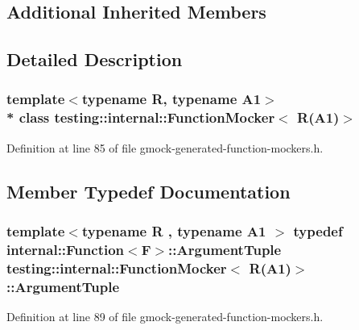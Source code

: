 \subsection*{Additional Inherited Members}


\subsection{Detailed Description}
\subsubsection*{template$<$typename R, typename A1$>$\\*
class testing\+::internal\+::\+Function\+Mocker$<$ R(\+A1)$>$}



Definition at line 85 of file gmock-\/generated-\/function-\/mockers.\+h.



\subsection{Member Typedef Documentation}
\subsubsection[{\texorpdfstring{Argument\+Tuple}{ArgumentTuple}}]{\setlength{\rightskip}{0pt plus 5cm}template$<$typename R , typename A1 $>$ typedef {\bf internal\+::\+Function}$<${\bf F}$>$\+::{\bf Argument\+Tuple} {\bf testing\+::internal\+::\+Function\+Mocker}$<$ {\bf R}(A1)$>$\+::{\bf Argument\+Tuple}}\hypertarget{classtesting_1_1internal_1_1_function_mocker_3_01_r_07_a1_08_4_aacec6412ac4343c071d7dfe965558b0b}{}\label{classtesting_1_1internal_1_1_function_mocker_3_01_r_07_a1_08_4_aacec6412ac4343c071d7dfe965558b0b}


Definition at line 89 of file gmock-\/generated-\/function-\/mockers.\+h.

